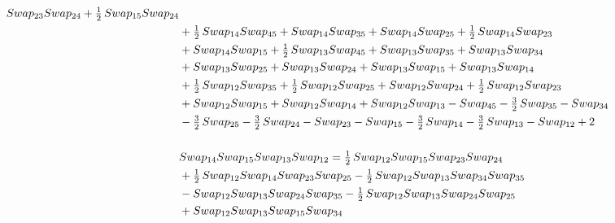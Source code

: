 \documentclass[10pt,a4paper]{amsart}
\begin{document}
\begin{align*}
        \textnormal{Swap}_{23} \textnormal{Swap}_{24} + \tfrac12\,\textnormal{Swap}_{15} \textnormal{Swap}_{24} \\ & + \tfrac12\,\textnormal{Swap}_{14} \textnormal{Swap}_{45} + \textnormal{Swap}_{14} \textnormal{Swap}_{35} + \textnormal{Swap}_{14} \textnormal{Swap}_{25} + \tfrac12\,\textnormal{Swap}_{14} \textnormal{Swap}_{23} \\ &+
        \textnormal{Swap}_{14} \textnormal{Swap}_{15} + \tfrac12\,\textnormal{Swap}_{13} \textnormal{Swap}_{45} + \textnormal{Swap}_{13} \textnormal{Swap}_{35} + \textnormal{Swap}_{13} \textnormal{Swap}_{34} \\ & + \textnormal{Swap}_{13} \textnormal{Swap}_{25} + \textnormal{Swap}_{13} \textnormal{Swap}_{24} + \textnormal{Swap}_{13} \textnormal{Swap}_{15}
        + \textnormal{Swap}_{13} \textnormal{Swap}_{14}\\ & + \tfrac12\,\textnormal{Swap}_{12} \textnormal{Swap}_{35} + \tfrac12\,\textnormal{Swap}_{12} \textnormal{Swap}_{25} + \textnormal{Swap}_{12} \textnormal{Swap}_{24} + \tfrac12\,\textnormal{Swap}_{12} \textnormal{Swap}_{23}\\ & + \textnormal{Swap}_{12} \textnormal{Swap}_{15}
        + \textnormal{Swap}_{12} \textnormal{Swap}_{14} + \textnormal{Swap}_{12} \textnormal{Swap}_{13} - \textnormal{Swap}_{45} - \tfrac32\,\textnormal{Swap}_{35} - \textnormal{Swap}_{34} \\ & - \tfrac32\,\textnormal{Swap}_{25}  - \tfrac32\,\textnormal{Swap}_{24} - \textnormal{Swap}_{23} -
        \textnormal{Swap}_{15} - \tfrac32\,\textnormal{Swap}_{14} - \tfrac32\,\textnormal{Swap}_{13} - \textnormal{Swap}_{12} + 2 \\
        \\ 
        &\textnormal{Swap}_{14}   \textnormal{Swap}_{15}   \textnormal{Swap}_{13}   \textnormal{Swap}_{12} = \tfrac12\,\textnormal{Swap}_{12} \textnormal{Swap}_{15} \textnormal{Swap}_{23} \textnormal{Swap}_{24}\\ &
        + \tfrac12\,\textnormal{Swap}_{12} \textnormal{Swap}_{14} \textnormal{Swap}_{23} \textnormal{Swap}_{25} 
        - \tfrac12\,\textnormal{Swap}_{12} \textnormal{Swap}_{13} \textnormal{Swap}_{34} \textnormal{Swap}_{35} \\ &
        -\textnormal{Swap}_{12} \textnormal{Swap}_{13} \textnormal{Swap}_{24} \textnormal{Swap}_{35} 
        - \tfrac12\,\textnormal{Swap}_{12} \textnormal{Swap}_{13} \textnormal{Swap}_{24} \textnormal{Swap}_{25} \\ &
        + \textnormal{Swap}_{12} \textnormal{Swap}_{13} \textnormal{Swap}_{15} \textnormal{Swap}_{34} 

\end{align*}
\end{document}
